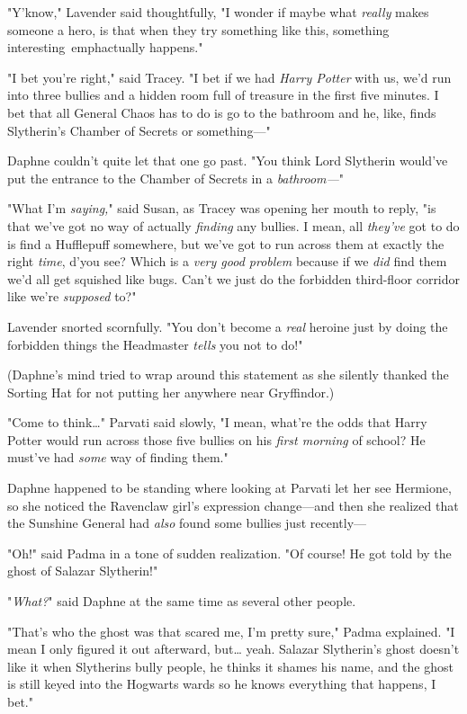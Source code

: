 "Y'know," Lavender said thoughtfully, "I wonder if maybe what \emph{really} 
makes someone a hero, is that when they try something like this, something 
interesting\ emph{actually happens}."

"I bet you're right," said Tracey. "I bet if we had \emph{Harry Potter} with 
us, we'd run into three bullies and a hidden room full of treasure in the first 
five minutes. I bet that all General Chaos has to do is go to the bathroom and 
he, like, finds Slytherin's Chamber of Secrets or something---"

Daphne couldn't quite let that one go past. "You think Lord Slytherin would've 
put the entrance to the Chamber of Secrets in a \emph{bathroom---}"

"What I'm \emph{saying,}" said Susan, as Tracey was opening her mouth to reply, 
"is that we've got no way of actually \emph{finding} any bullies. I mean, all 
\emph{they've} got to do is find a Hufflepuff somewhere, but we've got to run 
across them at exactly the right \emph{time}, d'you see? Which is a \emph{very 
good problem} because if we \emph{did} find them we'd all get squished like 
bugs. Can't we just do the forbidden third-floor corridor like we're 
\emph{supposed} to?"

Lavender snorted scornfully. "You don't become a \emph{real} heroine just by 
doing the forbidden things the Headmaster \emph{tells} you not to do!"

(Daphne's mind tried to wrap around this statement as she silently thanked the 
Sorting Hat for not putting her anywhere near Gryffindor.)

"Come to think{\ldots}" Parvati said slowly, "I mean, what're the odds that 
Harry Potter would run across those five bullies on his \emph{first morning} of 
school? He must've had \emph{some} way of finding them."

Daphne happened to be standing where looking at Parvati let her see Hermione, 
so she noticed the Ravenclaw girl's expression change---and then she realized 
that the Sunshine General had \emph{also} found some bullies just recently---

"Oh!" said Padma in a tone of sudden realization. "Of course! He got told by 
the ghost of Salazar Slytherin!"

"\emph{What?}" said Daphne at the same time as several other people.

"That's who the ghost was that scared me, I'm pretty sure," Padma explained. "I 
mean I only figured it out afterward, but{\ldots} yeah. Salazar Slytherin's 
ghost doesn't like it when Slytherins bully people, he thinks it shames his 
name, and the ghost is still keyed into the Hogwarts wards so he knows 
everything that happens, I bet."

